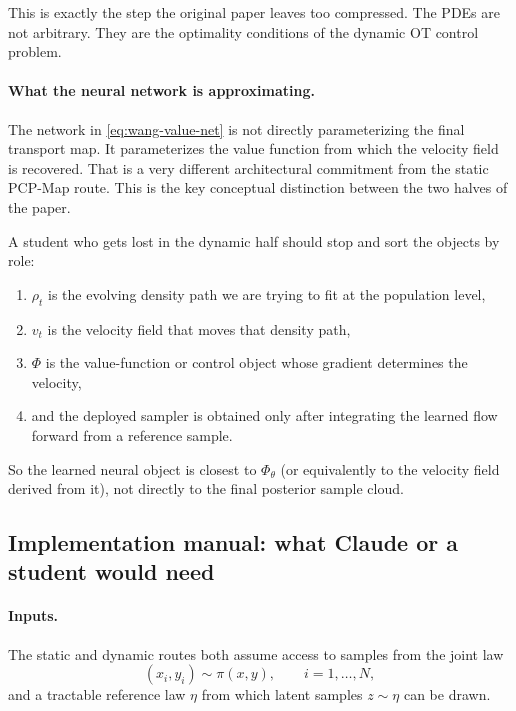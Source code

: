 \documentclass[11pt]{report}
\begin{document}
This is exactly the step the original paper leaves too compressed.  The PDEs are
not arbitrary.  They are the optimality conditions of the dynamic OT control
problem.

\paragraph{What the neural network is approximating.}
The network in \eqref{eq:wang-value-net} is not directly parameterizing the final
transport map.  It parameterizes the value function from which the velocity field
is recovered.  That is a very different architectural commitment from the static
PCP-Map route.  This is the key conceptual distinction between the two halves of
the paper.

A student who gets lost in the dynamic half should stop and sort the objects by
role:
\begin{enumerate}[label=(\roman*)]
  \item $\rho_t$ is the evolving density path we are trying to fit at the population level,
  \item $v_t$ is the velocity field that moves that density path,
  \item $\Phi$ is the value-function or control object whose gradient determines the velocity,
  \item and the deployed sampler is obtained only after integrating the learned flow forward from a reference sample.
\end{enumerate}
So the learned neural object is closest to $\Phi_\theta$ (or equivalently to the
velocity field derived from it), not directly to the final posterior sample cloud.

\subsection*{Implementation manual: what Claude or a student would need}

\paragraph{Inputs.}
The static and dynamic routes both assume access to samples from the joint law
\begin{equation}
(x_i,y_i) \sim \pi(x,y),
\qquad i=1,\ldots,N,
\label{eq:wang-training-pairs}
\end{equation}
and a tractable reference law $\eta$ from which latent samples $z\sim\eta$ can be
drawn.
\end{document}
